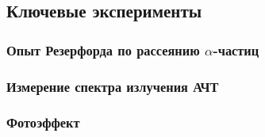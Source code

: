 \subsection{Ключевые эксперименты}

\subsubsection{Опыт Резерфорда по рассеянию $\alpha$-частиц}

\subsubsection{Измерение спектра излучения АЧТ}

\subsubsection{Фотоэффект}

